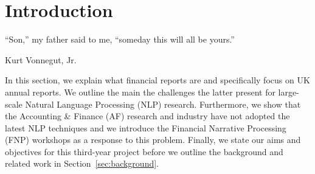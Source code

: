 \section{Introduction}\label{sec:introduction}

\epigraph{``Son,'' my father said to me, ``someday this will all be yours.''}{Kurt Vonnegut, Jr.}

In this section, we explain what financial reports are and specifically focus on UK annual reports.
We outline the main the challenges the latter present for large-scale Natural Language Processing (NLP) research.
Furthermore, we show that the Accounting \& Finance (AF) research and industry have not adopted the latest NLP techniques
and we introduce the Financial Narrative Processing (FNP) workshops as a response to this problem.
Finally, we state our aims and objectives for this third-year project before we outline the background and related work in Section~\ref{sec:background}.

